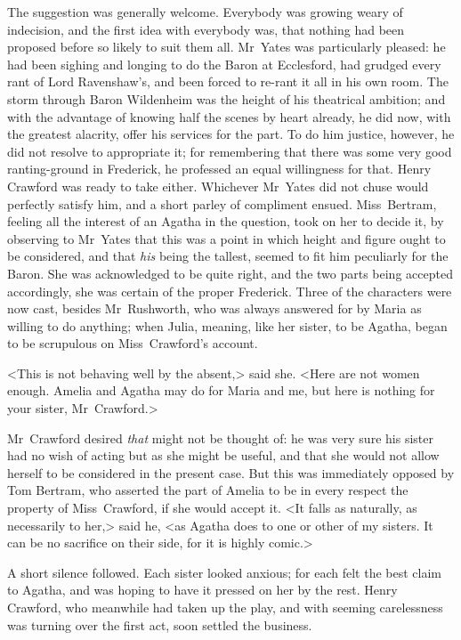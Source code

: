 The suggestion was generally welcome. Everybody was growing weary of indecision, and the first idea with everybody was, that nothing had been proposed before so likely to suit them all. Mr~Yates was particularly pleased: he had been sighing and longing to do the Baron at Ecclesford, had grudged every rant of Lord Ravenshaw's, and been forced to re-rant it all in his own room. The storm through Baron Wildenheim was the height of his theatrical ambition; and with the advantage of knowing half the scenes by heart already, he did now, with the greatest alacrity, offer his services for the part. To do him justice, however, he did not resolve to appropriate it; for remembering that there was some very good ranting-ground in Frederick, he professed an equal willingness for that. Henry Crawford was ready to take either. Whichever Mr~Yates did not chuse would perfectly satisfy him, and a short parley of compliment ensued. Miss~Bertram, feeling all the interest of an Agatha in the question, took on her to decide it, by observing to Mr~Yates that this was a point in which height and figure ought to be considered, and that \textit{his}  being the tallest, seemed to fit him peculiarly for the Baron. She was acknowledged to be quite right, and the two parts being accepted accordingly, she was certain of the proper Frederick. Three of the characters were now cast, besides Mr~Rushworth, who was always answered for by Maria as willing to do anything; when Julia, meaning, like her sister, to be Agatha, began to be scrupulous on Miss~Crawford's account.

<This is not behaving well by the absent,> said she. <Here are not women enough. Amelia and Agatha may do for Maria and me, but here is nothing for your sister, Mr~Crawford.>

Mr~Crawford desired \textit{that}  might not be thought of: he was very sure his sister had no wish of acting but as she might be useful, and that she would not allow herself to be considered in the present case. But this was immediately opposed by Tom Bertram, who asserted the part of Amelia to be in every respect the property of Miss~Crawford, if she would accept it. <It falls as naturally, as necessarily to her,> said he, <as Agatha does to one or other of my sisters. It can be no sacrifice on their side, for it is highly comic.>

A short silence followed. Each sister looked anxious; for each felt the best claim to Agatha, and was hoping to have it pressed on her by the rest. Henry Crawford, who meanwhile had taken up the play, and with seeming carelessness was turning over the first act, soon settled the business.

